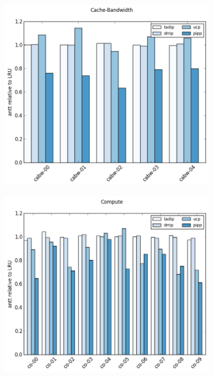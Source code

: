 \begin{figure}[ht]
\begin{subfigure}[b]{0.5\textwidth}
                \label{fig:processor_model:sensitivity:os}
        \end{subfigure}        
        \begin{subfigure}[b]{0.5\textwidth}
                \includegraphics[width=\textwidth]{../experiments/archives/02-algorithm-test/_figures/speedup/antt-cabw.png}
                \label{fig:processor_model:sensitivity:ol}
        \end{subfigure}%
        \begin{subfigure}[b]{0.5\textwidth}
                \includegraphics[width=\textwidth]{../experiments/archives/02-algorithm-test/_figures/speedup/antt-co.png}
                \label{fig:processor_model:sensitivity:os}
        \end{subfigure}
\end{figure}